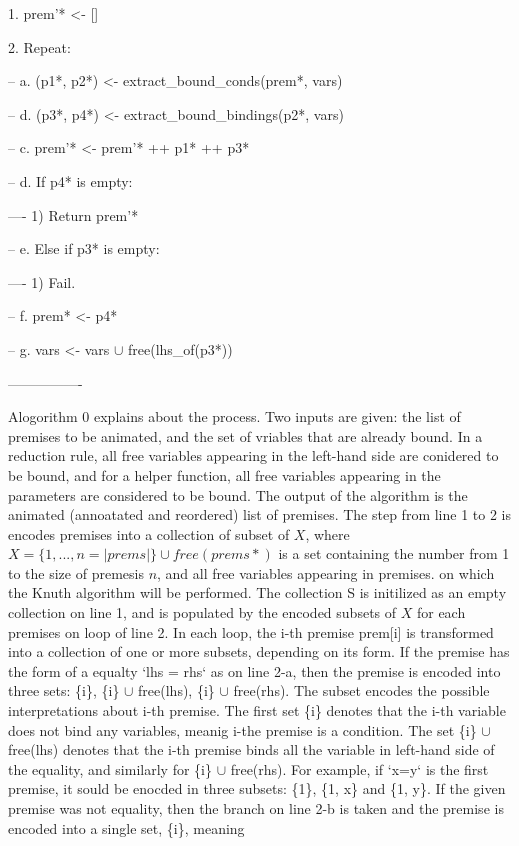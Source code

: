 1. prem'* <- []

2. Repeat:

-- a. (p1*, p2*) <- extract\_bound\_conds(prem*, vars)

-- d. (p3*, p4*) <- extract\_bound\_bindings(p2*, vars)

-- c. prem'* <- prem'* ++ p1* ++ p3*

-- d. If p4* is empty:

---- 1) Return prem'*

-- e. Else if p3* is empty:

---- 1) Fail.

-- f. prem* <- p4*

-- g. vars <- vars $\cup$ free(lhs\_of(p3*))

----------------

Alogorithm 0 explains about the process.
Two inputs are given: the list of premises to be animated, and the set of vriables that are already bound.
In a reduction rule, all free variables appearing in the left-hand side are conidered to be bound,
and for a helper function, all free variables appearing in the parameters are considered to be bound.
The output of the algorithm is the animated (annoatated and reordered) list of premises.
The step from line 1 to 2 is encodes premises into a collection of subset of $X$,
where $X = \{1, ..., n = |prems|\} \cup free(prems*)$ is a set containing the number from 1 to the size of
premesis $n$, and all free variables appearing in premises.
on which the Knuth algorithm will be performed. The collection S is initilized as an empty collection on
line 1, and is populated by the encoded subsets of $X$ for each premises on loop of line 2.
In each loop, the i-th premise prem[i] is transformed into a collection of one or
more subsets, depending on its form. If the premise has the form of a equalty `lhs = rhs` as on line 2-a,
then the premise is encoded into three sets: \{i\}, \{i\} $\cup$ free(lhs), \{i\} $\cup$ free(rhs). The subset encodes
the possible interpretations about i-th premise. The first set \{i\} denotes that
the i-th variable does not bind any variables, meanig i-the premise is a condition.
The set \{i\} $\cup$ free(lhs) denotes that the i-th premise binds all the variable in left-hand
side of the equality, and similarly for \{i\} $\cup$ free(rhs). For example, if `x=y` is the first premise,
it sould be enocded in three subsets: \{1\}, \{1, x\} and \{1, y\}. If the given premise was not equality,
then the branch on line 2-b is taken and the premise is encoded into a single set, \{i\}, meaning
